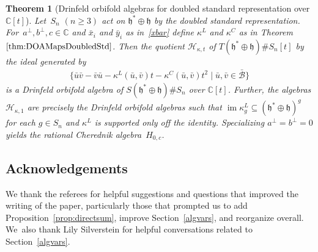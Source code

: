 \documentclass[pdftex]{sigma}
\numberwithin{equation}{section}
\newtheorem{Theorem}{Theorem}[section]
\DeclareMathOperator{\im}{im}
\begin{document}
\begin{Theorem}[{Drinfeld orbifold algebras for doubled standard representation over $\mathbb{C}[t]$}]\label{refexamples}
Let~$S_n$ $(n \geq 3)$ act on $\mathfrak{h}^* \oplus \mathfrak{h}$
by the doubled standard representation. For~$a^\perp,b^\perp,c \in \mathbb{C}$ and
$\bar{x}_i$ and $\bar{y}_i$ as in~\eqref{xbar} define
$\kappa^L$ and $\kappa^C$ as in Theorem~$\ref{thm:DOAMapsDoubledStd}$.
Then the quotient $\mathcal{H}_{\kappa,t}$ of $T(\mathfrak{h}^* \oplus \mathfrak{h}) \# S_n[t]$ by the ideal generated
by
\begin{gather*}
\big\{\bar{u}\bar{v}-\bar{v}\bar{u}-\kappa^L(\bar{u},\bar{v})t-\kappa^C(\bar{u},\bar{v})t^2 \mid \bar{u}, \bar{v} \in \bar{\mathcal{B}}\big\}
\end{gather*}
is a Drinfeld orbifold algebra of $S(\mathfrak{h}^* \oplus \mathfrak{h})\# S_n$ over $\mathbb{C}[t]$.
Further, the algebras $\mathcal{H}_{\kappa,1}$ are precisely the Drinfeld orbifold
algebras such that $\im\kappa^L_g\subseteq (\mathfrak{h}^*\oplus \mathfrak{h})^g$ for each $g\in S_n$ and $\kappa^L$
is supported only off the identity.
Specializing $a^\perp=b^\perp=0$ yields the rational Cherednik algebra~$H_{0,c}$.
\end{Theorem}

\subsection*{Acknowledgements}
We thank the referees for helpful suggestions and questions that improved the writing of the paper, particularly those that prompted us to add Proposition~\ref{prop:directsum}, improve Section~\ref{algvars}, and reorganize overall. We~also thank Lily Silverstein for helpful conversations related to Section~\ref{algvars}.
\end{document}

